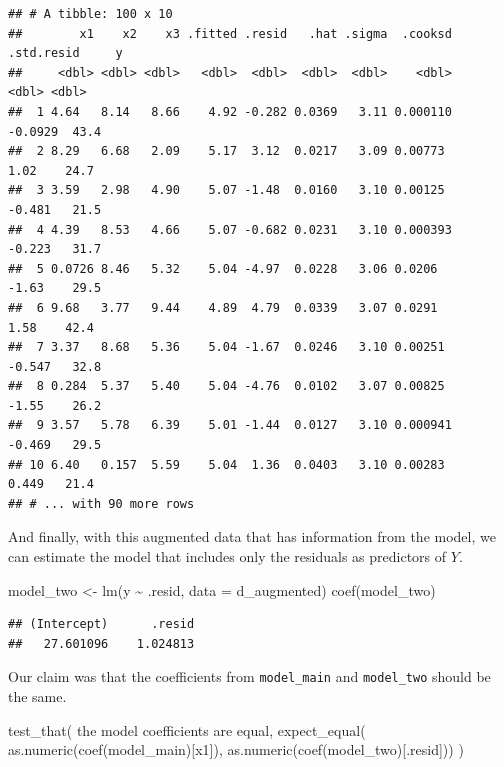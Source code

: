 \documentclass[
]{book}
\newenvironment{Shaded}{\begin{snugshade}}{\end{snugshade}}
\newcommand{\AttributeTok}[1]{\textcolor[rgb]{0.77,0.63,0.00}{#1}}
\newcommand{\FunctionTok}[1]{\textcolor[rgb]{0.00,0.00,0.00}{#1}}
\newcommand{\NormalTok}[1]{#1}
\newcommand{\OtherTok}[1]{\textcolor[rgb]{0.56,0.35,0.01}{#1}}
\newcommand{\SpecialCharTok}[1]{\textcolor[rgb]{0.00,0.00,0.00}{#1}}
\newcommand{\StringTok}[1]{\textcolor[rgb]{0.31,0.60,0.02}{#1}}
\theoremstyle{definition}
\theoremstyle{definition}
\theoremstyle{definition}
\theoremstyle{definition}
\theoremstyle{remark}
\begin{document}
\begin{verbatim}
## # A tibble: 100 x 10
##        x1    x2    x3 .fitted .resid   .hat .sigma  .cooksd .std.resid     y
##     <dbl> <dbl> <dbl>   <dbl>  <dbl>  <dbl>  <dbl>    <dbl>      <dbl> <dbl>
##  1 4.64   8.14   8.66    4.92 -0.282 0.0369   3.11 0.000110    -0.0929  43.4
##  2 8.29   6.68   2.09    5.17  3.12  0.0217   3.09 0.00773      1.02    24.7
##  3 3.59   2.98   4.90    5.07 -1.48  0.0160   3.10 0.00125     -0.481   21.5
##  4 4.39   8.53   4.66    5.07 -0.682 0.0231   3.10 0.000393    -0.223   31.7
##  5 0.0726 8.46   5.32    5.04 -4.97  0.0228   3.06 0.0206      -1.63    29.5
##  6 9.68   3.77   9.44    4.89  4.79  0.0339   3.07 0.0291       1.58    42.4
##  7 3.37   8.68   5.36    5.04 -1.67  0.0246   3.10 0.00251     -0.547   32.8
##  8 0.284  5.37   5.40    5.04 -4.76  0.0102   3.07 0.00825     -1.55    26.2
##  9 3.57   5.78   6.39    5.01 -1.44  0.0127   3.10 0.000941    -0.469   29.5
## 10 6.40   0.157  5.59    5.04  1.36  0.0403   3.10 0.00283      0.449   21.4
## # ... with 90 more rows
\end{verbatim}

And finally, with this augmented data that has information from the model, we can estimate the model that includes only the residuals as predictors of \(Y\).

\begin{Shaded}
\begin{Highlighting}[]
\NormalTok{model\_two }\OtherTok{\textless{}{-}} \FunctionTok{lm}\NormalTok{(y }\SpecialCharTok{\textasciitilde{}}\NormalTok{ .resid, }\AttributeTok{data =}\NormalTok{ d\_augmented)}
\FunctionTok{coef}\NormalTok{(model\_two)}
\end{Highlighting}
\end{Shaded}

\begin{verbatim}
## (Intercept)      .resid 
##   27.601096    1.024813
\end{verbatim}

Our claim was that the coefficients from \texttt{model\_main} and \texttt{model\_two} should be the same.

\begin{Shaded}
\begin{Highlighting}[]
\FunctionTok{test\_that}\NormalTok{(}
  \StringTok{\textquotesingle{}the model coefficients are equal\textquotesingle{}}\NormalTok{, }
  \FunctionTok{expect\_equal}\NormalTok{(}
    \FunctionTok{as.numeric}\NormalTok{(}\FunctionTok{coef}\NormalTok{(model\_main)[}\StringTok{\textquotesingle{}x1\textquotesingle{}}\NormalTok{]), }
    \FunctionTok{as.numeric}\NormalTok{(}\FunctionTok{coef}\NormalTok{(model\_two)[}\StringTok{\textquotesingle{}.resid\textquotesingle{}}\NormalTok{]))}
\NormalTok{)}
\end{Highlighting}
\end{Shaded}
\end{document}
